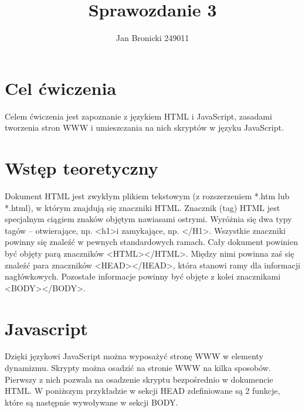\documentclass{article}
\title{Sprawozdanie 3}
\author{Jan Bronicki 249011}
\date{}
\begin{document}
\maketitle

\section{Cel ćwiczenia}

Celem ćwiczenia jest zapoznanie z językiem HTML i JavaScript, zasadami tworzenia stron
WWW i umieszczania na nich skryptów w języku JavaScript.


\section{Wstęp teoretyczny}

Dokument HTML jest zwykłym plikiem tekstowym (z rozszerzeniem *.htm lub *.html), w
którym znajdują się znaczniki HTML. Znacznik (tag) HTML jest specjalnym ciągiem znaków
objętym nawiasami ostrymi. Wyróżnia się dwa typy tagów – otwierające, np. \textless h1\textgreater i zamykające,
np. \textless/H1\textgreater. Wszystkie znaczniki powinny się znaleźć w pewnych standardowych ramach. Cały
dokument powinien być objęty parą znaczników \textless HTML\textgreater \textless/HTML\textgreater. Między nimi powinna zaś się
znaleźć para znaczników \textless HEAD\textgreater\textless/HEAD\textgreater, która stanowi ramy dla informacji nagłówkowych.
Pozostałe informacje powinny być objęte z kolei znacznikami \textless BODY\textgreater\textless/BODY\textgreater. 

\section{Javascript}
Dzięki językowi JavaScript można wyposażyć stronę WWW w elementy dynamizmu. Skrypty
można osadzić na stronie WWW na kilka sposobów. Pierwszy z nich pozwala na osadzenie
skryptu bezpośrednio w dokumencie HTML. W poniższym przykładzie w sekcji HEAD
zdefiniowane są 2 funkcje, które są następnie wywoływane w sekcji BODY.
\end{document}
